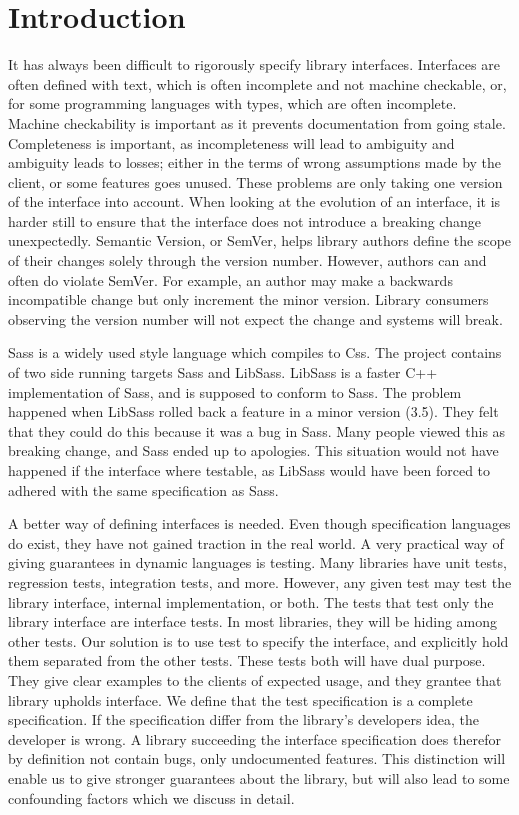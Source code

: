\section{Introduction}

It has always been difficult to rigorously specify library interfaces.
Interfaces are often defined with text, which is often incomplete and not
machine checkable, or, for some programming languages with types, which are
often incomplete. Machine checkability is important as it prevents
documentation from going stale. Completeness is important, as incompleteness
will lead to ambiguity and ambiguity leads to losses; either in the terms of
wrong assumptions made by the client, or some features goes unused. These
problems are only taking one version of the interface into account. When
looking at the evolution of an interface, it is harder still to ensure that the
interface does not introduce a breaking change unexpectedly. Semantic Version, or
SemVer, helps library authors define the scope of their changes solely through
the version number. However, authors can and often do violate SemVer. For
example, an author may make a backwards incompatible change but only increment
the minor version. Library consumers observing the version number will not
expect the change and systems will break. 

Sass is a widely used style language which compiles to Css. The project
contains of two side running targets Sass and LibSass. LibSass is a 
faster C++ implementation of Sass, and is supposed to conform to Sass. The
problem happened when LibSass rolled back a feature in a minor version (3.5). 
They felt that they could do this because it was a bug in Sass. Many people 
viewed this as breaking change, and Sass ended up to apologies. This situation
would not have happened if the interface where testable, as LibSass would have
been forced to adhered with the same specification as Sass\cite{libsass}. 
%

A better way of defining interfaces is needed. Even though specification
languages do exist, they have not gained traction in the real world. A very
practical way of giving guarantees in dynamic languages is testing.  Many
libraries have unit tests, regression tests, integration tests, and more.
However, any given test may test the library interface, internal
implementation, or both.  The tests that test only the library interface are
interface tests. In most libraries, they will be hiding among other tests.  Our
solution is to use test to specify the interface, and explicitly hold them
separated from the other tests. These tests both will have dual purpose. They
give clear examples to the clients of expected usage, and they grantee that
library upholds interface. We define that the test specification is a complete
specification. If the specification differ from the library's developers idea,
the developer is wrong.  A library succeeding the interface specification does
therefor by definition not contain bugs, only undocumented features. This
distinction will enable us to give stronger guarantees about the library, but
will also lead to some confounding factors which we discuss in detail.

